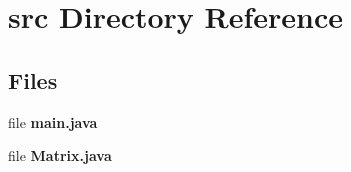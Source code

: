 \section{src Directory Reference}
\label{dir_68267d1309a1af8e8297ef4c3efbcdba}
\subsection*{Files}
\begin{DoxyCompactItemize}
\item 
file {\bf main.\+java}
\item 
file {\bf Matrix.\+java}
\end{DoxyCompactItemize}
